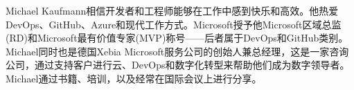 Michael Kaufmann相信开发者和工程师能够在工作中感到快乐和高效。他热爱DevOps、GitHub、Azure和现代工作方式。Microsoft授予他Microsoft区域总监(RD)和Microsoft最有价值专家(MVP)称号——后者属于DevOps和GitHub类别。Michael同时也是德国Xebia Microsoft服务公司的创始人兼总经理，这是一家咨询公司，通过支持客户进行云、DevOps和数字化转型来帮助他们成为数字领导者。Michael通过书籍、培训，以及经常在国际会议上进行分享。